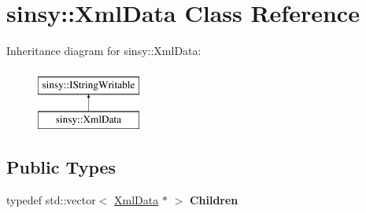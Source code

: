 \hypertarget{classsinsy_1_1XmlData}{\section{sinsy\-:\-:\-Xml\-Data \-Class \-Reference}
\label{classsinsy_1_1XmlData}
}
\-Inheritance diagram for sinsy\-:\-:\-Xml\-Data\-:\begin{figure}[H]
\begin{center}
\leavevmode
\includegraphics[height=2.000000cm]{classsinsy_1_1XmlData}
\end{center}
\end{figure}
\subsection*{\-Public \-Types}
\begin{DoxyCompactItemize}
\item 
\hypertarget{classsinsy_1_1XmlData_acd4c1a20bf66dfc7f8a6728e2df3400a}{typedef std\-::vector$<$ \hyperlink{classsinsy_1_1XmlData}{\-Xml\-Data} $\ast$ $>$ {\bfseries \-Children}}\label{classsinsy_1_1XmlData_acd4c1a20bf66dfc7f8a6728e2df3400a}

\end{DoxyCompactItemize}

